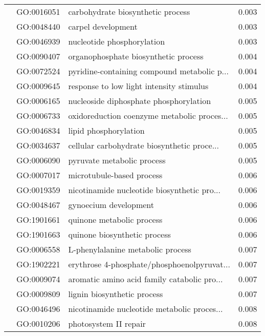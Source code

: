 \begin{longtable}{lllr}
   & GO:0016051 &            carbohydrate biosynthetic process &         0.003 \\
   & GO:0048440 &                           carpel development &         0.003 \\
   & GO:0046939 &                   nucleotide phosphorylation &         0.003 \\
   & GO:0090407 &         organophosphate biosynthetic process &         0.004 \\
   & GO:0072524 &  pyridine-containing compound metabolic p... &         0.004 \\
   & GO:0009645 &     response to low light intensity stimulus &         0.004 \\
   & GO:0006165 &       nucleoside diphosphate phosphorylation &         0.005 \\
   & GO:0006733 &  oxidoreduction coenzyme metabolic proces... &         0.005 \\
   & GO:0046834 &                        lipid phosphorylation &         0.005 \\
   & GO:0034637 &  cellular carbohydrate biosynthetic proce... &         0.005 \\
   & GO:0006090 &                   pyruvate metabolic process &         0.005 \\
   & GO:0007017 &                    microtubule-based process &         0.006 \\
   & GO:0019359 &  nicotinamide nucleotide biosynthetic pro... &         0.006 \\
   & GO:0048467 &                        gynoecium development &         0.006 \\
   & GO:1901661 &                    quinone metabolic process &         0.006 \\
   & GO:1901663 &                 quinone biosynthetic process &         0.006 \\
   & GO:0006558 &            L-phenylalanine metabolic process &         0.007 \\
   & GO:1902221 &  erythrose 4-phosphate/phosphoenolpyruvat... &         0.007 \\
   & GO:0009074 &  aromatic amino acid family catabolic pro... &         0.007 \\
   & GO:0009809 &                  lignin biosynthetic process &         0.007 \\
   & GO:0046496 &  nicotinamide nucleotide metabolic proces... &         0.008 \\
   & GO:0010206 &                        photosystem II repair &         0.008 \\

\end{longtable}
